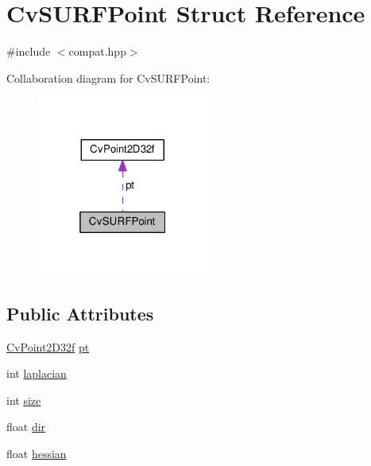 \hypertarget{structCvSURFPoint}{\section{Cv\-S\-U\-R\-F\-Point Struct Reference}
\label{structCvSURFPoint}
}


{\ttfamily \#include $<$compat.\-hpp$>$}



Collaboration diagram for Cv\-S\-U\-R\-F\-Point\-:\nopagebreak
\begin{figure}[H]
\begin{center}
\leavevmode
\includegraphics[width=160pt]{structCvSURFPoint__coll__graph}
\end{center}
\end{figure}
\subsection*{Public Attributes}
\begin{DoxyCompactItemize}
\item 
\hyperlink{structCvPoint2D32f}{Cv\-Point2\-D32f} \hyperlink{structCvSURFPoint_a60dfd069a42d57a2259d862b14f287c1}{pt}
\item 
int \hyperlink{structCvSURFPoint_a584a2aa3e1c046b3e57b2a9c0d82c73d}{laplacian}
\item 
int \hyperlink{structCvSURFPoint_a0f46678907ba7a867a9eb2ade22a80eb}{size}
\item 
float \hyperlink{structCvSURFPoint_a08e42d76fd78454974c1a2ce38e05c53}{dir}
\item 
float \hyperlink{structCvSURFPoint_ae24f023d123a23323684928d6bb423c6}{hessian}
\end{DoxyCompactItemize}


